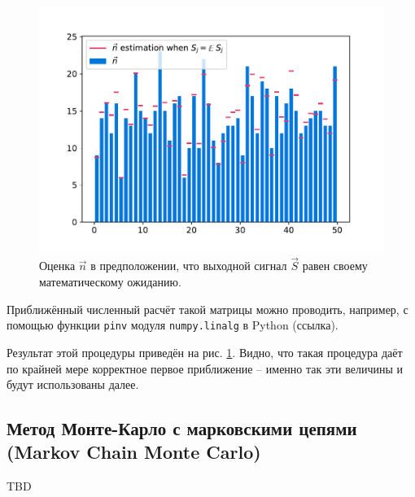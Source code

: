 \documentclass[12pt]{article}
\begin{document}
	\begin{figure}[H]
		\centering
		\includegraphics[width=\columnwidth]{mean-estimation}
		\caption{Оценка $\vec{n}$ в предположении, что выходной сигнал $\vec{S}$ равен своему математическому ожиданию.}
		\label{pic:mean-estimation}
	\end{figure}
	
	Приближённый численный расчёт такой матрицы можно проводить, например, с помощью функции \verb|pinv| модуля \verb|numpy.linalg| в Python (ссылка).

	Результат этой процедуры приведён на рис. \ref{pic:mean-estimation}. Видно, что такая процедура даёт по крайней мере корректное первое приближение -- именно так эти величины и будут использованы далее.
	
	\subsection{Метод Монте-Карло с марковскими цепями (Markov Chain Monte Carlo)}
	
	TBD
	
\end{document}
